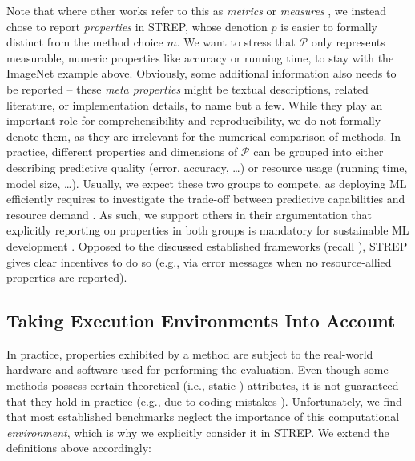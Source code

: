 \documentclass[sn-mathphys,Numbered]{sn-jnl}%
\theoremstyle{thmstylethree}%
\begin{document}
Note that where other works refer to this as \emph{metrics} \cite{paperswithcode} or \emph{measures} \cite{vanschoren2014openml}, we instead chose to report \emph{properties} in STREP, whose denotion $p$ is easier to formally distinct from the method choice $m$.
We want to stress that $\mathcal{P}$ only represents measurable, numeric properties like accuracy or running time, to stay with the ImageNet example above.
Obviously, some additional information also needs to be reported -- these \emph{meta properties} might be textual descriptions, related literature, or implementation details, to name but a few.
While they play an important role for comprehensibility and reproducibility, we do not formally denote them, as they are irrelevant for the numerical comparison of methods.
In practice, different properties and dimensions of $\mathcal{P}$ can be grouped into either describing predictive quality (error, accuracy, \dots) or resource usage (running time, model size, \dots). 
Usually, we expect these two groups to compete, as deploying ML efficiently requires to investigate the trade-off between predictive capabilities and resource demand \cite{Assessing_Energy_Efficiency_of_ML}.
As such, we support others in their argumentation that explicitly reporting on properties in both groups is mandatory for sustainable ML development \cite{Schwartz/etal/2020b}.
Opposed to the discussed established frameworks (recall ), STREP gives clear incentives to do so (e.g., via error messages when no resource-allied properties are reported).

\subsection{Taking Execution Environments Into Account}
\label{sec:meth:comparability_and_index_scale}

In practice, properties exhibited by a method are subject to the real-world hardware and software used for performing the evaluation.
Even though some methods possess certain theoretical (i.e., static \cite{yeswecare}) attributes, it is not guaranteed that they hold in practice (e.g., due to coding mistakes \cite{sun_empirical_2017}).
Unfortunately, we find that most established benchmarks neglect the importance of this computational \emph{environment}, which is why we explicitly consider it in STREP.
We extend the definitions above accordingly:
\end{document}
